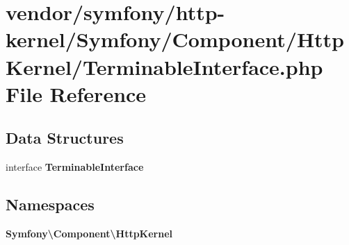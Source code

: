 \section{vendor/symfony/http-\/kernel/\+Symfony/\+Component/\+Http\+Kernel/\+Terminable\+Interface.php File Reference}
\label{_terminable_interface_8php}
\subsection*{Data Structures}
\begin{DoxyCompactItemize}
\item 
interface {\bf Terminable\+Interface}
\end{DoxyCompactItemize}
\subsection*{Namespaces}
\begin{DoxyCompactItemize}
\item 
 {\bf Symfony\textbackslash{}\+Component\textbackslash{}\+Http\+Kernel}
\end{DoxyCompactItemize}
